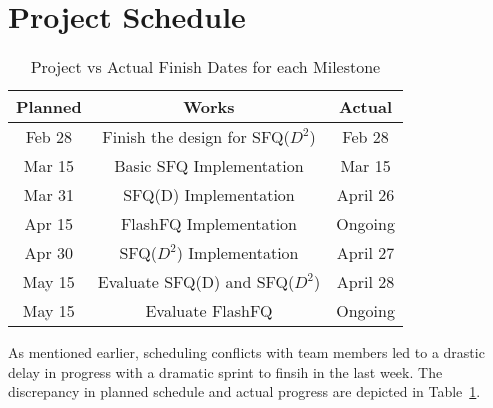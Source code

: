\section{Project Schedule}

\begin{table}[t]
	\centering
	\tabcolsep=0.11cm
	\begin{tabular}{|c|c|c|}
		\hline
		Planned & Works & Actual\\
		\hline
		Feb 28 & Finish the design for SFQ($D^2$) & Feb 28\\ 
		\hline
		Mar 15 & Basic SFQ Implementation & Mar 15\\
		\hline
		Mar 31 & SFQ(D) Implementation & April 26\\
		\hline
		Apr 15 & FlashFQ Implementation & Ongoing \\
		\hline
		Apr 30 & SFQ($D^2$) Implementation & April 27\\
		\hline
		May 15 & Evaluate SFQ(D) and SFQ($D^2$) & April 28\\
		\hline
                May 15 & Evaluate FlashFQ  & Ongoing\\
		\hline

	\end{tabular}
	\caption{Project vs Actual Finish Dates for each Milestone}
	\vspace{-12pt}
	\label{table:traces}
\end{table}

As mentioned earlier, scheduling conflicts with team members led to a
drastic delay in progress with a dramatic sprint to finsih in the last
week. The discrepancy in planned schedule and actual progress are
depicted in Table~\ref{table:traces}.
